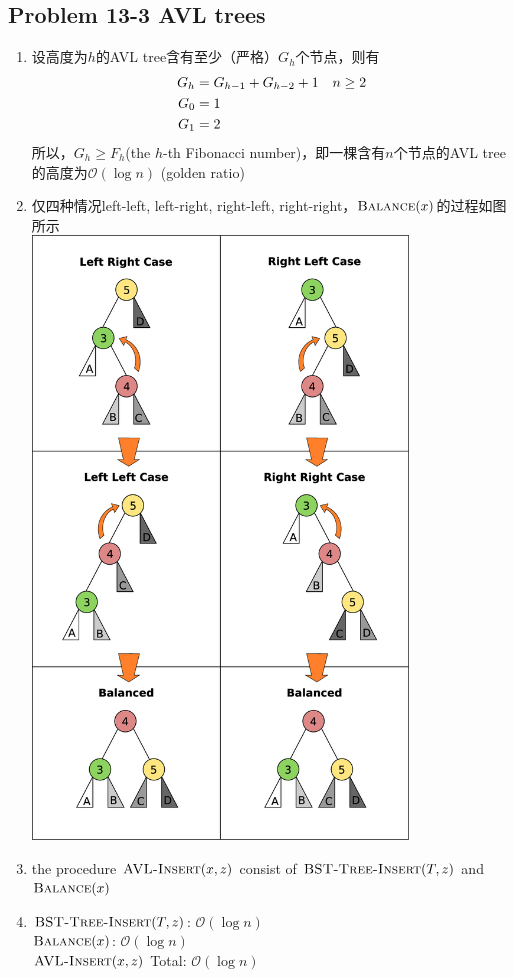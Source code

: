 \subsection*{Problem 13-3 AVL trees}
\begin{enumerate}
	\item	设高度为$h$的AVL tree含有至少（严格）$G_h$个节点，则有
		\begin{equation} \notag
		\begin{aligned}
			G_h &= G_{h - 1} + G_{h - 2} + 1		&& n \geq 2 \\
			G_0 &= 1 \\
			G_1 &= 2
		\end{aligned}
		\end{equation}
		所以，$G_h \geq F_h$(the $h$-th Fibonacci number)，即一棵含有$n$个节点的AVL tree的高度为$\mathcal{O}(\log{n})$ (golden ratio)
	\item	仅四种情况left-left, left-right, right-left, right-right，$\textnormal{\scshape Balance}(x)$的过程如图所示 \\
		\includegraphics[height=16cm]{chapter13/AVL_Tree_Rebalancing.eps}

	\item	the procedure $\textnormal{\scshape AVL-Insert}(x, z)$ consist of $\textnormal{\scshape BST-Tree-Insert}(T, z)$ and $\textnormal{\scshape Balance}(x)$
	\item	$\textnormal{\scshape BST-Tree-Insert}(T, z)$: $\mathcal{O}(\log{n})$ \\
		$\textnormal{\scshape Balance}(x)$: $\mathcal{O}(\log{n})$ \\
		$\textnormal{\scshape AVL-Insert}(x, z)$ Total: $\mathcal{O}(\log{n})$
\end{enumerate}

